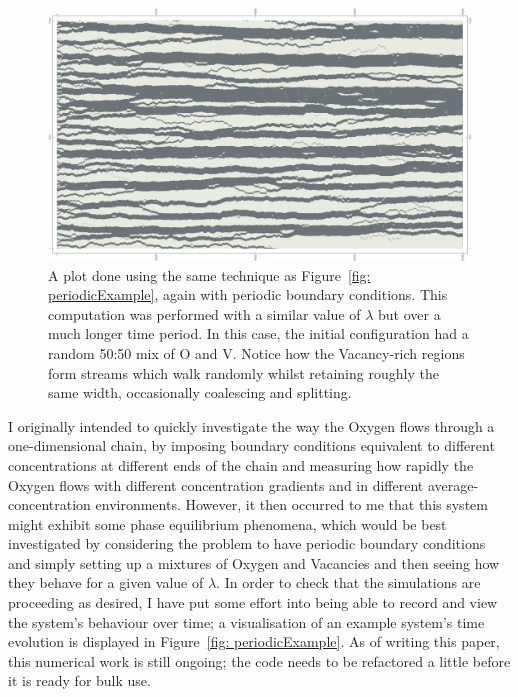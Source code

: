 \begin{figure}[h]
\centering
 \includegraphics[width=\textwidth]{../tex-src/images/fractures1}
 \caption{A plot done using the same technique as Figure~\ref{fig: periodicExample}, again with periodic boundary conditions. This computation was performed with a similar value of $\lambda$ but over a much longer time period.
 In this case, the initial configuration had a random 50:50 mix of O and V. Notice how the Vacancy-rich
 regions form streams which walk randomly whilst retaining roughly the same width, occasionally coalescing and splitting.}
 \label{fig: fractureExample}
\end{figure}
     
I originally intended to quickly investigate the way the Oxygen flows through a one-dimensional chain, by imposing boundary conditions equivalent to different concentrations at different ends of the chain and measuring how rapidly
the Oxygen flows with different concentration gradients and in different average-concentration environments. However, it then occurred to me that this system might exhibit some phase equilibrium phenomena, which would be best investigated
by considering the problem to have periodic boundary conditions and simply setting up a mixtures of Oxygen and Vacancies and then seeing how they behave for a given value of $\lambda$. In order to check that the simulations are proceeding
as desired, I have put some effort into being able to record and view the system's behaviour over time; a visualisation of an example system's time evolution is displayed in Figure~\ref{fig: periodicExample}.
As of writing this paper, this numerical work is still ongoing; the code needs to be refactored a little before it is ready for bulk use.

